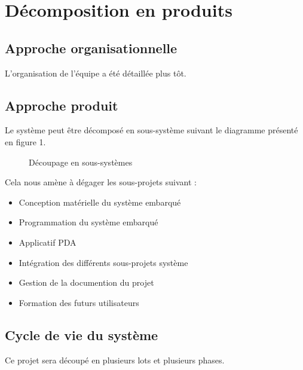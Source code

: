 \section{Décomposition en produits}

\subsection{Approche organisationnelle}
L'organisation de l'équipe a été détaillée plus tôt.

\subsection{Approche produit}

Le système peut être décomposé en sous-système suivant le diagramme
présenté en figure 1.\\

\begin{figure}
\caption{Découpage en sous-systèmes}
\end{figure}

Cela nous amène à dégager les sous-projets suivant :

\begin{itemize}
\item Conception matérielle du système embarqué
\item Programmation du système embarqué
\item Applicatif PDA
\item Intégration des différents sous-projets système
\item Gestion de la documention du projet
\item Formation des futurs utilisateurs
\end{itemize}


\subsection{Cycle de vie du système}

Ce projet sera découpé en plusieurs lots et plusieurs phases.
